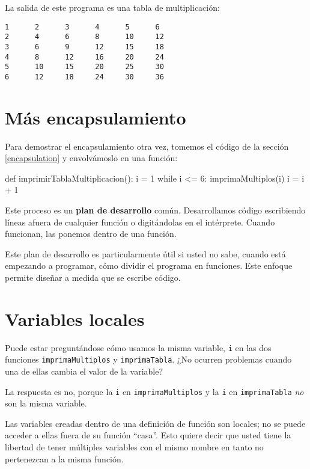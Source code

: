La salida de este programa es una tabla de multiplicación:
\begin{verbatim}
1      2      3      4      5      6
2      4      6      8      10     12
3      6      9      12     15     18
4      8      12     16     20     24
5      10     15     20     25     30
6      12     18     24     30     36
\end{verbatim}

\section{Más encapsulamiento}

Para demostrar el encapsulamiento otra vez, tomemos el código de la
sección \ref{encapsulation} y envolvámoslo en una función:
\begin{pythoncode}
def imprimirTablaMultiplicacion():
  i = 1
  while i <= 6:
    imprimaMultiplos(i)
    i = i + 1
\end{pythoncode}

Este proceso es un \textbf{plan de desarrollo} común. Desarrollamos
código escribiendo líneas afuera de cualquier función o digitándolas
en el intérprete. Cuando funcionan, las ponemos dentro de una función.

Este plan de desarrollo es particularmente útil si usted no sabe,
cuando está empezando a programar, cómo dividir el programa en funciones.
Este enfoque permite diseñar a medida que se escribe código.

\section{Variables locales}

 

Puede estar preguntándose cómo usamos la misma variable, \texttt{i}
en las dos funciones \texttt{imprimaMultiplos} y \texttt{imprimaTabla}.
¿No ocurren problemas cuando una de ellas cambia el valor de la variable?

La respuesta es no, porque la \texttt{i} en \texttt{imprimaMultiplos}
y la \texttt{i} en \texttt{imprimaTabla} {\em no} son la misma
variable.

Las variables creadas dentro de una definición de función son locales;
no se puede acceder a ellas fuera de su función ``casa''. Esto quiere
decir que usted tiene la libertad de tener múltiples variables con
el mismo nombre en tanto no pertenezcan a la misma función.

